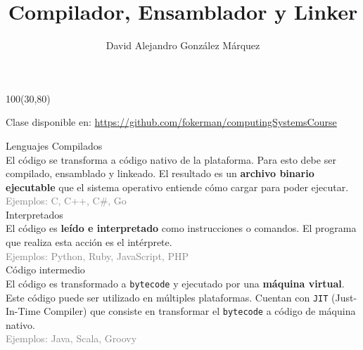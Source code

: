 \documentclass[aspectratio=169]{beamer}
\title{\Huge Compilador, Ensamblador y Linker}
\author{David Alejandro González Márquez}
\date{}
\begin{document}
\begin{frame}[plain]
    \titlepage
    \begin{textblock}{100}(30,80)
    \begin{tcolorbox}[size=small,width=\textwidth,colback={gray!30},title={}]
    \begin{center}
     \scriptsize Clase disponible en: \url{https://github.com/fokerman/computingSystemsCourse}
    \end{center}
    \end{tcolorbox}
    \end{textblock}
\end{frame}

\begin{frame}[fragile,t]{Lenguajes}
    \textcolor{naranjauca}{Compilados}\\
    El código se transforma a código nativo de la plataforma. Para esto debe ser compilado, ensamblado y linkeado. El resultado es un \textbf{archivo binario ejecutable} que el sistema operativo entiende cómo cargar para poder ejecutar.\\
    \textcolor{gray}{Ejemplos: C, C++, C\#, Go}\\
    \vspace{0.2cm}
    \pause
    \textcolor{naranjauca}{Interpretados}\\
    El código es \textbf{leído e interpretado} como instrucciones o comandos. El programa que realiza esta acción es el intérprete.\\ 
    \textcolor{gray}{Ejemplos: Python, Ruby, JavaScript, PHP}\\
    \vspace{0.2cm}
    \pause
    \textcolor{naranjauca}{Código intermedio}\\
    El código es transformado a \texttt{bytecode} y ejecutado por una \textbf{máquina virtual}. Este código puede ser utilizado en múltiples plataformas. Cuentan con \texttt{JIT} (Just-In-Time Compiler) que consiste en transformar el \texttt{bytecode} a código de máquina nativo.\\
    \textcolor{gray}{Ejemplos: Java, Scala, Groovy}\\
\end{frame}
\end{document}
